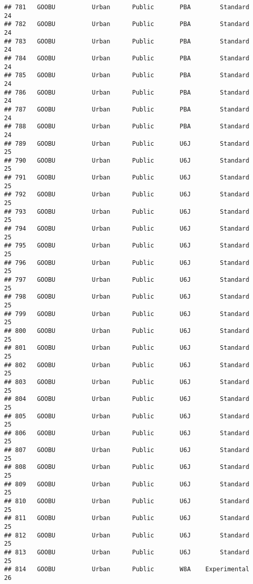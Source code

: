 \documentclass[
]{article}
\begin{document}
\begin{verbatim}
## 781   GOOBU          Urban      Public       PBA        Standard        24
## 782   GOOBU          Urban      Public       PBA        Standard        24
## 783   GOOBU          Urban      Public       PBA        Standard        24
## 784   GOOBU          Urban      Public       PBA        Standard        24
## 785   GOOBU          Urban      Public       PBA        Standard        24
## 786   GOOBU          Urban      Public       PBA        Standard        24
## 787   GOOBU          Urban      Public       PBA        Standard        24
## 788   GOOBU          Urban      Public       PBA        Standard        24
## 789   GOOBU          Urban      Public       U6J        Standard        25
## 790   GOOBU          Urban      Public       U6J        Standard        25
## 791   GOOBU          Urban      Public       U6J        Standard        25
## 792   GOOBU          Urban      Public       U6J        Standard        25
## 793   GOOBU          Urban      Public       U6J        Standard        25
## 794   GOOBU          Urban      Public       U6J        Standard        25
## 795   GOOBU          Urban      Public       U6J        Standard        25
## 796   GOOBU          Urban      Public       U6J        Standard        25
## 797   GOOBU          Urban      Public       U6J        Standard        25
## 798   GOOBU          Urban      Public       U6J        Standard        25
## 799   GOOBU          Urban      Public       U6J        Standard        25
## 800   GOOBU          Urban      Public       U6J        Standard        25
## 801   GOOBU          Urban      Public       U6J        Standard        25
## 802   GOOBU          Urban      Public       U6J        Standard        25
## 803   GOOBU          Urban      Public       U6J        Standard        25
## 804   GOOBU          Urban      Public       U6J        Standard        25
## 805   GOOBU          Urban      Public       U6J        Standard        25
## 806   GOOBU          Urban      Public       U6J        Standard        25
## 807   GOOBU          Urban      Public       U6J        Standard        25
## 808   GOOBU          Urban      Public       U6J        Standard        25
## 809   GOOBU          Urban      Public       U6J        Standard        25
## 810   GOOBU          Urban      Public       U6J        Standard        25
## 811   GOOBU          Urban      Public       U6J        Standard        25
## 812   GOOBU          Urban      Public       U6J        Standard        25
## 813   GOOBU          Urban      Public       U6J        Standard        25
## 814   GOOBU          Urban      Public       W8A    Experimental        26

\end{verbatim}
\end{document}
